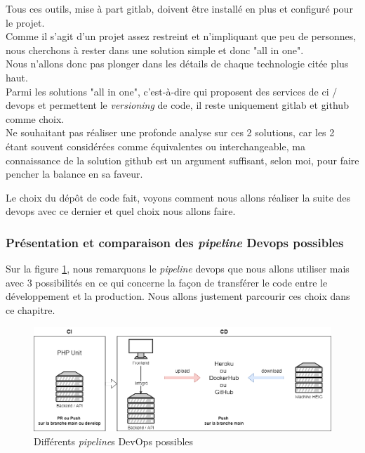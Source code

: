 \documentclass[
    iai, %
    il, %
]{heig-tb}
\begin{document}
Tous ces outils, mise à part \Gls{gitlab}, doivent être installé en plus et configuré pour le projet.\\
Comme il s'agit d'un projet assez restreint et n'impliquant que peu de personnes, nous cherchons à rester dans une solution simple et donc "all in one".\\
Nous n'allons donc pas plonger dans les détails de chaque technologie citée plus haut.\\
Parmi les solutions "all in one", c'est-à-dire qui proposent des services de \Gls{ci} / \Gls{devops} et permettent le \emph{versioning} de code, il reste uniquement \Gls{gitlab} et \Gls{github} comme choix.\\
Ne souhaitant pas réaliser une profonde analyse sur ces 2 solutions, car les 2 étant souvent considérées comme équivalentes ou interchangeable, ma connaissance de la solution \Gls{github} est un argument suffisant, selon moi, pour faire pencher la balance en sa faveur.

Le choix du dépôt de code fait, voyons comment nous allons réaliser la suite des \Gls{devops} avec ce dernier et quel choix nous allons faire.

\subsubsection{Présentation et comparaison des \emph{pipeline} Devops possibles}

Sur la figure \ref{devops-choix.drawio}, nous remarquons le \emph{pipeline} \Gls{devops} que nous allons utiliser mais avec 3 possibilités en ce qui concerne la façon de transférer le code entre le développement et la production. Nous allons justement parcourir ces choix dans ce chapitre.

\begin{center}
    \begin{figure}[H]
        \includegraphics[width=\textwidth]{./assets/figures/devops-choix.drawio.png}
        \caption{Différents \emph{pipeline}s DevOps possibles \label{devops-choix.drawio}}
    \end{figure}
\end{center}
\end{document}
